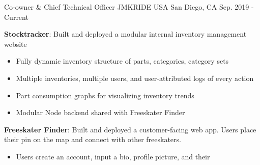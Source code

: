 

\begin{cventries}

  \cventry
    {Co-owner \& Chief Technical Officer} %
    {
      \hspace{0.7em}JMKRIDE USA
    } %
    {San Diego, CA} %
    {Sep. 2019 - Current} %
    {
      \begin{cvitems} %
        \item {
          \textbf{Stocktracker}: Built and deployed a modular internal inventory management website 
          \newline{}
          \begin{itemize}[leftmargin=0.5cm]
            \item{Fully dynamic inventory structure of parts, categories, category sets}
            \item{Multiple inventories, multiple users, and user-attributed logs of every action}
            \item{Part consumption graphs for visualizing inventory trends}
            \item{Modular Node backend shared with Freeskater Finder}
          \end{itemize}
        }
        \item{
          \textbf{Freeskater Finder}: Built and deployed a customer-facing web
          app. Users place their pin on the map and connect with other
          freeskaters.
          \newline{}
          \begin{itemize}[leftmargin=0.5cm]
            \item{
              Users create an account, input a bio, profile picture, and their
}
\end{itemize}}
\end{cvitems}}
\end{cventries}
